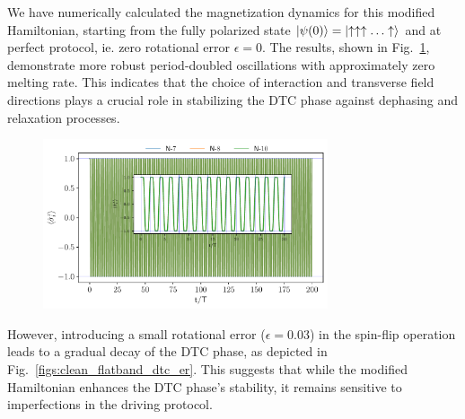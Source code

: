 \documentclass[a4paper, 10pt]{article}
\begin{document}
We have numerically calculated the magnetization dynamics for this modified Hamiltonian, starting from the fully polarized state $\ket{\psi(0)} = \ket{\uparrow \uparrow \uparrow \ldots \uparrow}$ and at perfect protocol, ie. zero rotational error $\epsilon = 0$. The results, shown in Fig.~\ref{figs:clean_flatband_dtc}, demonstrate more robust period-doubled oscillations with approximately zero melting rate. This indicates that the choice of interaction and transverse field directions plays a crucial role in stabilizing the DTC phase against dephasing and relaxation processes.

\begin{figure}[h!]
    \centering
    \includegraphics[height=5cm]{figs/DTC_mag_inset_er=0.0_J=0.18_g=0.09.pdf}
    \caption{}
    \label{figs:clean_flatband_dtc}
\end{figure}

However, introducing a small rotational error ($\epsilon = 0.03$) in the spin-flip operation leads to a gradual decay of the DTC phase, as depicted in Fig.~\ref{figs:clean_flatband_dtc_er}. This suggests that while the modified Hamiltonian enhances the DTC phase's stability, it remains sensitive to imperfections in the driving protocol.
\end{document}
